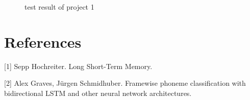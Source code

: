 \documentclass{article}
\begin{document}
\begin{figure}[h]
	\centering
	\caption{test result of project 1}
	\label{final result}
\end{figure} 




\section*{References}
[1] Sepp Hochreiter. Long Short-Term Memory. 

[2] Alex Graves, Jürgen Schmidhuber. Framewise phoneme classification with bidirectional LSTM and other neural network architectures. 
\end{document}

